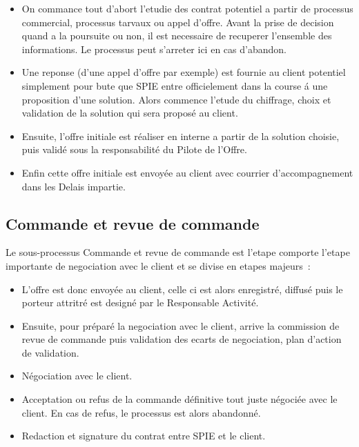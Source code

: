 \begin{itemize}
    \item On commance tout d'abort l'etudie des contrat potentiel a partir de processus commercial,
    processus tarvaux ou appel d'offre. Avant la prise de decision quand a la poursuite ou non,
    il est necessaire de recuperer l'ensemble des informations. Le processus peut s'arreter ici
    en cas d'abandon.
    \item Une reponse (d'une appel d'offre par exemple) est fournie au client potentiel simplement
    pour bute que SPIE entre officielement dans la course \'a une proposition d'une solution. Alors
    commence l'etude du chiffrage, choix et validation de la solution qui sera propos\'e au client.
    \item Ensuite, l'offre initiale est r\'ealiser en interne a partir de la solution choisie, puis
    valid\'e sous la responsabilit\'e du Pilote de l'Offre.
    \item Enfin cette offre initiale est envoy\'ee au client avec courrier d'accompagnement dans les
    Delais impartie.
\end{itemize}

\subsection{Commande et revue de commande}

Le sous-processus Commande et revue de commande est l'etape comporte l'etape importante de negociation
avec le client et se divise en etapes majeurs~:

\begin{itemize}
    \item L'offre est donc envoy\'ee au client, celle ci est alors enregistr\'e, diffus\'e puis le
    porteur attritr\'e est design\'e par le Responsable Activit\'e.
    \item Ensuite, pour pr\'epar\'e la negociation avec le client, arrive la commission de revue de
    commande puis validation des ecarts de negociation, plan d'action de validation.
    \item N\'egociation avec le client.
    \item Acceptation ou refus de la commande d\'efinitive tout juste n\'egoci\'ee avec le client.
    En cas de refus, le processus est alors abandonn\'e.
    \item Redaction et signature du contrat entre SPIE et le client.
\end{itemize}

